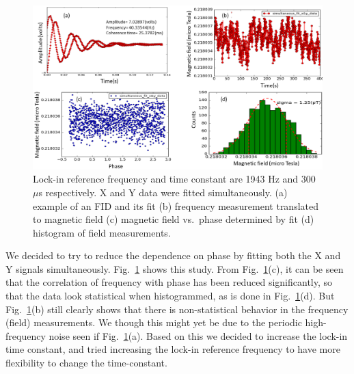 \begin{figure}%
\centering\includegraphics[width=0.9\linewidth]{figures/freq_1943_simultaneous_fit_300microsec_.png}
\caption{Lock-in reference frequency and time constant are 1943 Hz and
  300~$\mu$s respectively.  X and Y data were fitted simultaneously.
  (a) example of an FID and its fit (b) frequency measurement
  translated to magnetic field (c) magnetic field vs.~phase determined
  by fit (d) histogram of field
  measurements.\label{fig:freq_1943_simultaneous_fit_300_micro_sec}}
\end{figure}

We decided to try to reduce the dependence on phase by fitting both
the X and Y signals simultaneously.
Fig.~\ref{fig:freq_1943_simultaneous_fit_300_micro_sec} shows this
study.  From
Fig.~\ref{fig:freq_1943_simultaneous_fit_300_micro_sec}(c), it can be
seen that the correlation of frequency with phase has been reduced
significantly, so that the data look statistical when histogrammed, as
is done in Fig.~\ref{fig:freq_1943_simultaneous_fit_300_micro_sec}(d).
But Fig.~\ref{fig:freq_1943_simultaneous_fit_300_micro_sec}(b) still
clearly shows that there is non-statistical behavior in the frequency
(field) measurements.  We though this might yet be due to the periodic
high-frequency noise seen if
Fig.~\ref{fig:freq_1943_simultaneous_fit_300_micro_sec}(a).  Based on
this we decided to increase the lock-in time constant, and tried
increasing the lock-in reference frequency to have more flexibility to
change the time-constant.

